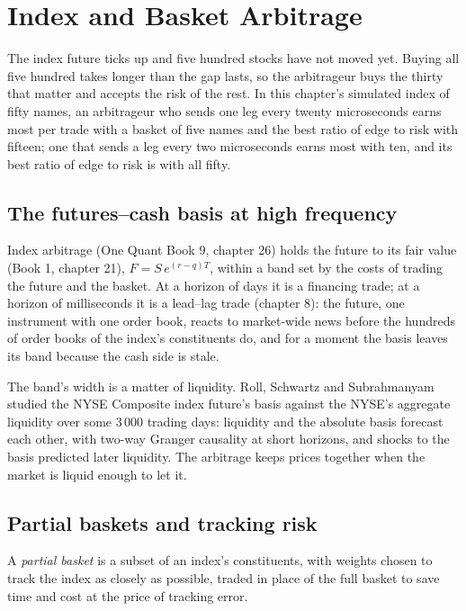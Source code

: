 \chapter{Index and Basket Arbitrage}\label{ch:hf:index-and-basket-arbitrage}

The index future ticks up and five hundred stocks have not moved yet. Buying all five hundred takes longer than the gap lasts, so the arbitrageur
buys the thirty that matter and accepts the risk of the rest. In this chapter's simulated index of fifty names, an arbitrageur who sends one leg
every twenty microseconds earns most per trade with a basket of five names and the best ratio of edge to risk with fifteen; one that sends a leg
every two microseconds earns most with ten, and its best ratio of edge to risk is with all fifty.

\section{The futures--cash basis at high frequency}

Index arbitrage (One Quant Book 9, chapter 26) holds the future to its fair value (Book 1, chapter 21), $F=S\,e^{(r-q)T}$, within a band set by the
costs of trading the future and the basket. At a horizon of days it is a financing trade; at a horizon of milliseconds it is a lead--lag trade
(chapter 8): the future, one instrument with one order book, reacts to market-wide news before the hundreds of order books of the index's
constituents do, and for a moment the basis leaves its band because the cash side is stale.

The band's width is a matter of liquidity. Roll, Schwartz and Subrahmanyam studied the NYSE Composite index future's basis against the NYSE's
aggregate liquidity over some 3\,000 trading days: liquidity and the absolute basis forecast each other, with two-way Granger causality at short
horizons, and shocks to the basis predicted later liquidity. The arbitrage keeps prices together when the market is liquid enough to let it.

\section{Partial baskets and tracking risk}

\begin{definition}\label{def:hf:index-and-basket-arbitrage:partial}
A \emph{partial basket} is a subset of an index's constituents, with weights chosen to track the index as closely as possible,
traded in place of the full basket to save time and cost at the price of tracking error.
\end{definition}

